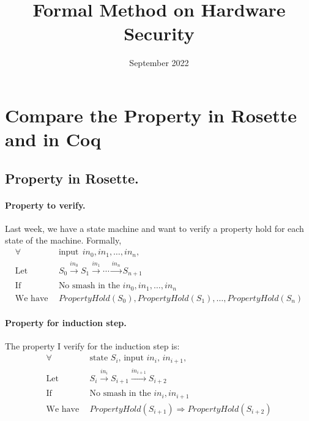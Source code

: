 \documentclass{article}
\title{Formal Method on Hardware Security}
\author{}
\date{September 2022}
\begin{document}
\maketitle










\section{Compare the Property in Rosette and in Coq}


\subsection{Property in Rosette.}

\paragraph{Property to verify.}
Last week, we have a state machine and want to verify a property hold for each state of the machine.
Formally,
\begin{align*}
\forall &~~ \text{input} ~~ in_0, in_1, \dots, in_n, \\
\text{Let} &~~ S_0 \xrightarrow[]{in_0} S_{1} \xrightarrow[]{in_1} \cdots \xrightarrow[]{in_n} S_{n+1} \\
\text{If} &~~ \text{No smash in the $in_0, in_1, \dots, in_n$} \\
\text{We have} &~~ PropertyHold(S_0), PropertyHold(S_1), \dots, PropertyHold(S_n)
\end{align*}




\paragraph{Property for induction step.}
The property I verify for the induction step is:
\begin{align*}
\forall &~~ \text{state $S_i$, input $in_i$, $in_{i+1}$}, \\
\text{Let} &~~ S_i \xrightarrow[]{in_i} S_{i+1} \xrightarrow[]{in_{i+1}} S_{i+2} \\
\text{If} &~~ \text{No smash in the $in_i, in_{i+1}$} \\
\text{We have} &~~ PropertyHold(S_{i+1}) \Rightarrow PropertyHold(S_{i+2})
\end{align*}
\end{document}
